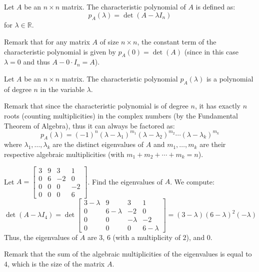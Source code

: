\begin{definition}
    Let $A$ be an $n \times n$ matrix. The characteristic polynomial of $A$ is defined as:
    \[
        p_A(\lambda) = \det(A - \lambda I_n)
    \]
    for $\lambda \in \mathbb{R}$.
\end{definition}
Remark that for any matrix $A$ of size $n \times n$, the constant term of the characteristic polynomial is given by $p_A(0) = \det(A)$ (since in this case $\lambda = 0$ and thus $A - 0 \cdot I_n = A$).

\begin{theorem}
    Let $A$ be an $n \times n$ matrix. The characteristic polynomial $p_A(\lambda)$ is a polynomial of degree $n$ in the variable $\lambda$.
\end{theorem}
Remark that since the characteristic polynomial is of degree $n$, it has exactly $n$ roots (counting multiplicities) in the complex numbers (by the Fundamental Theorem of Algebra), thus it can always be factored as:
\[p_A(\lambda) = (-1)^n (\lambda - \lambda_1)^{m_1} (\lambda - \lambda_2)^{m_2} \cdots (\lambda - \lambda_k)^{m_k}\]
where $\lambda_1, \ldots, \lambda_k$ are the distinct eigenvalues of $A$ and $m_1, \ldots, m_k$ are their respective algebraic multiplicities (with $m_1 + m_2 + \cdots + m_k = n$).

\begin{eg}
    Let $A = \begin{bmatrix}
        3 & 9 & 3 & 1 \\
        0 & 6 & -2 & 0 \\
        0 & 0 & 0 & -2 \\
        0 & 0 & 0 & 6
    \end{bmatrix}$. Find the eigenvalues of $A$. We compute:
    \[\det(A - \lambda I_4) = \det\begin{bmatrix}
        3 - \lambda & 9 & 3 & 1 \\
        0 & 6 - \lambda & -2 & 0 \\
        0 & 0 & -\lambda & -2 \\
        0 & 0 & 0 & 6 - \lambda
    \end{bmatrix} = (3 - \lambda)(6 - \lambda)^2 (-\lambda)\]
    Thus, the eigenvalues of $A$ are $3$, $6$ (with a multiplicity of $2$), and $0$.
\end{eg}
Remark that the sum of the algebraic multiplicities of the eigenvalues is equal to $4$, which is the size of the matrix $A$.

